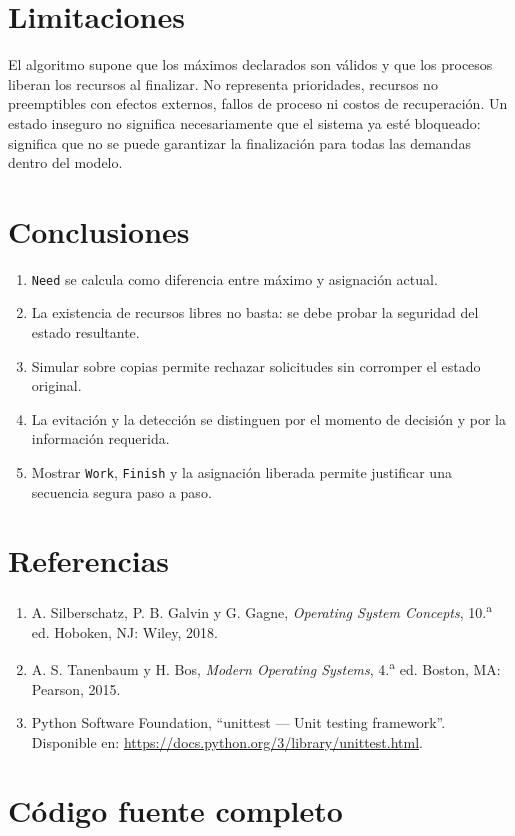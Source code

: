 \documentclass[12pt,a4paper]{article}
\begin{document}
\section{Limitaciones}
El algoritmo supone que los máximos declarados son válidos y que los procesos liberan los recursos al finalizar. No representa prioridades, recursos no preemptibles con efectos externos, fallos de proceso ni costos de recuperación. Un estado inseguro no significa necesariamente que el sistema ya esté bloqueado: significa que no se puede garantizar la finalización para todas las demandas dentro del modelo.
\section{Conclusiones}
\begin{enumerate}
\item \texttt{Need} se calcula como diferencia entre máximo y asignación actual.
\item La existencia de recursos libres no basta: se debe probar la seguridad del estado resultante.
\item Simular sobre copias permite rechazar solicitudes sin corromper el estado original.
\item La evitación y la detección se distinguen por el momento de decisión y por la información requerida.
\item Mostrar \texttt{Work}, \texttt{Finish} y la asignación liberada permite justificar una secuencia segura paso a paso.
\end{enumerate}
\section{Referencias}
\begin{enumerate}
\item A. Silberschatz, P. B. Galvin y G. Gagne, \emph{Operating System Concepts}, 10.\textsuperscript{a} ed. Hoboken, NJ: Wiley, 2018.
\item A. S. Tanenbaum y H. Bos, \emph{Modern Operating Systems}, 4.\textsuperscript{a} ed. Boston, MA: Pearson, 2015.
\item Python Software Foundation, ``unittest --- Unit testing framework''. Disponible en: \url{https://docs.python.org/3/library/unittest.html}.
\end{enumerate}
\appendix
\section{Código fuente completo}
\end{document}
